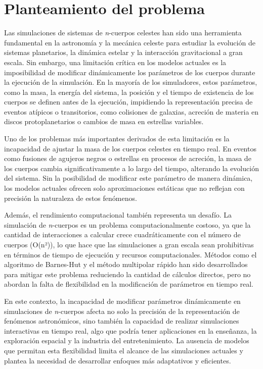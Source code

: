\section{Planteamiento del problema}
Las simulaciones de sistemas de \textit{n}-cuerpos celestes han sido una herramienta fundamental en la astronomía y la mecánica celeste para estudiar la evolución de sistemas planetarios, la dinámica estelar y la interacción gravitacional a gran escala. Sin embargo, una limitación crítica en los modelos actuales es la imposibilidad de modificar dinámicamente los parámetros de los cuerpos durante la ejecución de la simulación. En la mayoría de los simuladores, estos parámetros, como la masa, la energía del sistema, la posición y el tiempo de existencia de los cuerpos se definen antes de la ejecución, impidiendo la representación precisa de eventos atípicos o transitorios, como colisiones de galaxias, acreción de materia en discos protoplanetarios o cambios de masa en estrellas variables.

Uno de los problemas más importantes derivados de esta limitación es la incapacidad de ajustar la masa de los cuerpos celestes en tiempo real. En eventos como fusiones de agujeros negros o estrellas en procesos de acreción, la masa de los cuerpos cambia significativamente a lo largo del tiempo, alterando la evolución del sistema. Sin la posibilidad de modificar este parámetro de manera dinámica, los modelos actuales ofrecen solo aproximaciones estáticas que no reflejan con precisión la naturaleza de estos fenómenos.

Además, el rendimiento computacional también representa un desafío. La simulación de \textit{n}-cuerpos es un problema computacionalmente costoso, ya que la cantidad de interacciones a calcular crece cuadráticamente con el número de cuerpos (O(n²)), lo que hace que las simulaciones a gran escala sean prohibitivas en términos de tiempo de ejecución y recursos computacionales. Métodos como el algoritmo de Barnes-Hut y el método multipolar rápido han sido desarrollados para mitigar este problema reduciendo la cantidad de cálculos directos, pero no abordan la falta de flexibilidad en la modificación de parámetros en tiempo real.

En este contexto, la incapacidad de modificar parámetros dinámicamente en simulaciones de \textit{n}-cuerpos afecta no solo la precisión de la representación de fenómenos astronómicos, sino también la capacidad de realizar simulaciones interactivas en tiempo real, algo que podría tener aplicaciones en la enseñanza, la exploración espacial y la industria del entretenimiento. La ausencia de modelos que permitan esta flexibilidad limita el alcance de las simulaciones actuales y plantea la necesidad de desarrollar enfoques más adaptativos y eficientes.